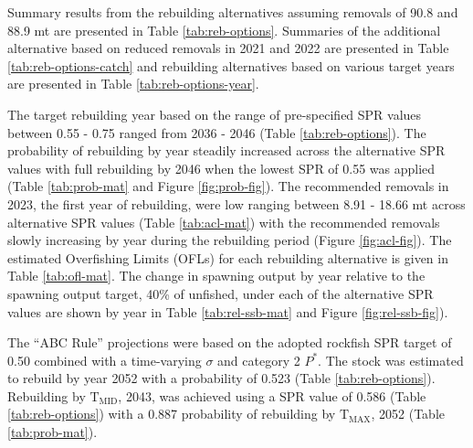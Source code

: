 \documentclass[11pt,
  english,
  a4paper,
]{article}
\begin{document}
\leavevmode\tagmcend\tagstructend\par


Summary results from the rebuilding alternatives assuming removals of 90.8 and 88.9 mt are presented in Table \ref{tab:reb-options}. Summaries of the additional alternative based on reduced removals in 2021 and 2022 are presented in Table \ref{tab:reb-options-catch} and rebuilding alternatives based on various target years are presented in Table \ref{tab:reb-options-year}.

\leavevmode\tagmcend\tagstructend\par


The target rebuilding year based on the range of pre-specified SPR values between 0.55 - 0.75 ranged from 2036 - 2046 (Table \ref{tab:reb-options}). The probability of rebuilding by year steadily increased across the alternative SPR values with full rebuilding by 2046 when the lowest SPR of 0.55 was applied (Table \ref{tab:prob-mat} and Figure \ref{fig:prob-fig}). The recommended removals in 2023, the first year of rebuilding, were low ranging between 8.91 - 18.66 mt across alternative SPR values (Table \ref{tab:acl-mat}) with the recommended removals slowly increasing by year during the rebuilding period (Figure \ref{fig:acl-fig}). The estimated Overfishing Limits (OFLs) for each rebuilding alternative is given in Table \ref{tab:ofl-mat}. The change in spawning output by year relative to the spawning output target, 40\% of unfished, under each of the alternative SPR values are shown by year in Table \ref{tab:rel-ssb-mat} and Figure \ref{fig:rel-ssb-fig}).

\leavevmode\tagmcend\tagstructend\par


The ``ABC Rule'' projections were based on the adopted rockfish SPR target of 0.50 combined with a time-varying {\(\sigma\)\leavevmode\tagmcend\tagstructend} and category 2 {\(P^*\)\leavevmode\tagmcend\tagstructend}. The stock was estimated to rebuild by year 2052 with a probability of 0.523 (Table \ref{tab:reb-options}). Rebuilding by {\(\text{T}_\text{MID}\)\leavevmode\tagmcend\tagstructend}, 2043, was achieved using a SPR value of 0.586 (Table \ref{tab:reb-options}) with a 0.887 probability of rebuilding by {\(\text{T}_\text{MAX}\)\leavevmode\tagmcend\tagstructend}, 2052 (Table \ref{tab:prob-mat}).
\end{document}
